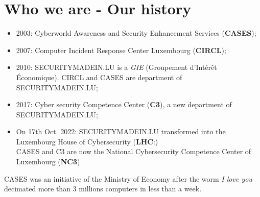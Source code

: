 %
%
\section*{Who we are - Our history}
\begin{frame}
  \begin{center}
    \begin{itemize}
      \item 2003: Cyberworld Awareness and Security Enhancement Services (\textbf{CASES});
      \item 2007: Computer Incident Response Center Luxembourg (\textbf{CIRCL});
      \item 2010: SECURITYMADEIN.LU is a \textit{GIE} (Groupement d’Intérêt Économique). CIRCL and CASES are department of SECURITYMADEIN.LU;
      \item 2017: Cyber security Competence Center (\textbf{C3}), a new department of SECURITYMADEIN.LU;
      \item On 17th Oct. 2022: SECURITYMADEIN.LU transformed into the Luxembourg House of Cybersecurity (\textbf{LHC}:)\\
        CASES and C3 are now the National Cybersecurity Competence Center of Luxembourg (\textbf{NC3})
    \end{itemize}
  \end{center}
  CASES was an initiative of the Ministry of Economy after the worm
  \textit{I love you} decimated more than 3 millions computers in less than a week.
\end{frame}

%
%

